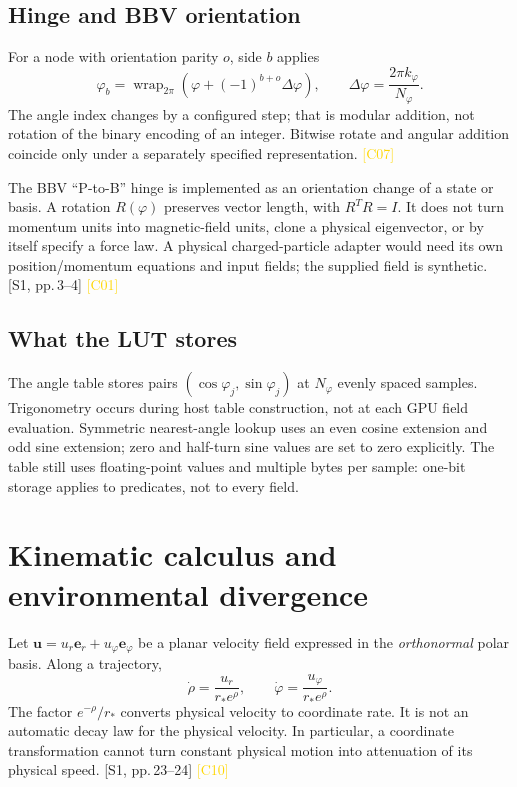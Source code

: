 \documentclass[11pt,a4paper]{article}
\newcommand{\src}[2]{\textcolor{muted}{[#1, #2]}}
\newcommand{\corr}[1]{\textcolor{gold}{\textsf{[#1]}}}
\newcommand{\ph}{\varphi}
\newcommand{\wrap}{\operatorname{wrap}}
\begin{document}
\subsection{Hinge and BBV orientation}
For a node with orientation parity $o$, side $b$ applies
\begin{equation}
 \ph_b=\wrap_{2\pi}\!\left(\ph+(-1)^{b+o}\Delta\ph\right),\qquad
 \Delta\ph=\frac{2\pi k_\ph}{N_\ph}.
\end{equation}
The angle index changes by a configured step; that is modular addition, not rotation of the binary encoding of an integer. Bitwise rotate and angular addition coincide only under a separately specified representation. \corr{C07}

The BBV ``P-to-B'' hinge is implemented as an orientation change of a state or basis. A rotation $R(\ph)$ preserves vector length, with $R^TR=I$. It does not turn momentum units into magnetic-field units, clone a physical eigenvector, or by itself specify a force law. A physical charged-particle adapter would need its own position/momentum equations and input fields; the supplied field is synthetic. \src{S1}{pp.\,3--4} \corr{C01}

\subsection{What the LUT stores}
The angle table stores pairs $(\cos\ph_j,\sin\ph_j)$ at $N_\ph$ evenly spaced samples. Trigonometry occurs during host table construction, not at each GPU field evaluation. Symmetric nearest-angle lookup uses an even cosine extension and odd sine extension; zero and half-turn sine values are set to zero explicitly. The table still uses floating-point values and multiple bytes per sample: one-bit storage applies to predicates, not to every field.
\clearpage

\section{Kinematic calculus and environmental divergence}
Let $\mathbf u=u_r\mathbf e_r+u_\ph\mathbf e_\ph$ be a planar velocity field expressed in the \emph{orthonormal} polar basis. Along a trajectory,
\begin{equation}
 \dot\rho=\frac{u_r}{r_*e^\rho},\qquad
 \dot\ph=\frac{u_\ph}{r_*e^\rho}.
\end{equation}
The factor $e^{-\rho}/r_*$ converts physical velocity to coordinate rate. It is not an automatic decay law for the physical velocity. In particular, a coordinate transformation cannot turn constant physical motion into attenuation of its physical speed. \src{S1}{pp.\,23--24} \corr{C10}
\end{document}
